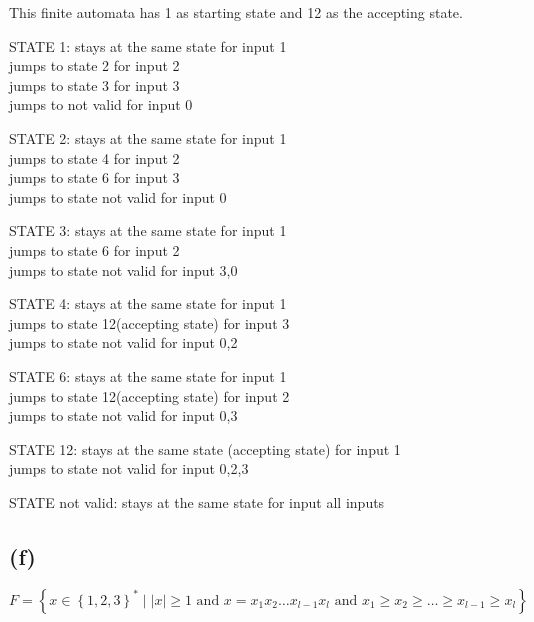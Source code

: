 This finite automata has 1 as starting state and 12 as the accepting state.

STATE 1: stays at the same state for input 1\\
         jumps to state 2 for input 2 \\
         jumps to state 3 for input 3\\
         jumps to not valid for input 0

STATE 2: stays at the same state for input 1\\
         jumps to state 4 for input 2 \\
         jumps to state 6 for input 3 \\
         jumps to state not valid for input 0

STATE 3: stays at the same state for input 1\\
         jumps to state 6 for input 2 \\
         jumps to state not valid for input 3,0 

STATE 4: stays at the same state for input 1 \\
         jumps to state 12(accepting state) for input 3\\ 
         jumps to state not valid for input 0,2

STATE 6: stays at the same state for input 1\\
         jumps to state 12(accepting state) for input 2\\ 
         jumps to state not valid for input 0,3

STATE 12: stays at the same state (accepting state) for input 
          1\\                   
          jumps to state not valid for input 0,2,3

STATE not valid: stays at the same state for input all inputs\\
        
         


\subsection{(f)}

$F = \left\{ x \in \left\{1,2,3\right\} ^{*} \mid \lvert x \rvert \geq 1 \text{ and } x = x_1x_2\ldots x_{l-1}x_l \text{ and } x_1 \geq x_2 \geq \ldots \geq x_{l-1} \geq x_l \right\}$

